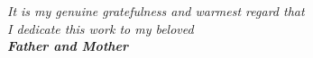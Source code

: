 \begin{center}
  
    \vspace*{\fill}
  \itshape {\large{It is my genuine gratefulness and warmest regard that \\I dedicate this work to my beloved} \\ \vspace{0.2in}
 \Large{ \bfseries{Father and Mother}}}
    \vspace*{\fill}
\end{center}
\clearpage
